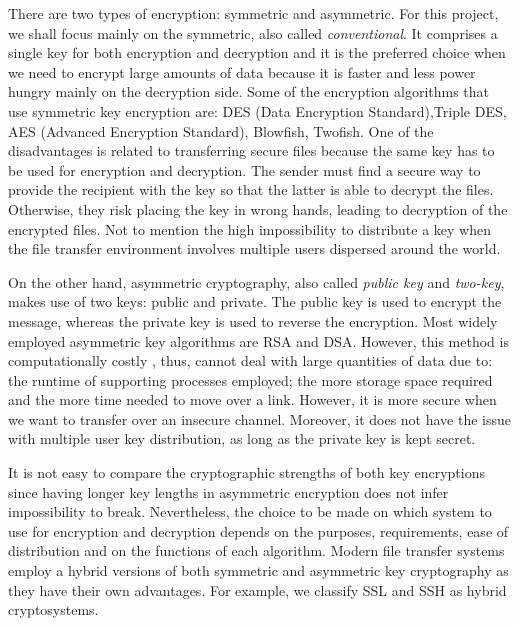 There are two types of encryption: symmetric and asymmetric. For this project, we shall focus mainly on the symmetric, also called \emph{conventional}. It comprises a single key for both encryption and decryption and it is the preferred choice when we need to encrypt large amounts of data because it is faster and less power hungry mainly on the decryption side. Some of the encryption algorithms that use symmetric key encryption are: DES (Data Encryption Standard),Triple DES, AES (Advanced Encryption Standard), Blowfish, Twofish. One of the disadvantages is related to transferring secure files because the same key has to be used for encryption and decryption. The sender must find a secure way to provide the recipient with the key so that the latter is able to decrypt the files. Otherwise, they risk placing the key in wrong hands, leading to decryption of the encrypted files. Not to mention the high impossibility to distribute a key when the file transfer environment involves multiple users dispersed around the world. 

On the other hand, asymmetric cryptography, also called \emph{public key} and \emph{two-key}, makes use of two keys: public and private. The public key is used to encrypt the message, whereas the private key is used to reverse the encryption. Most widely employed asymmetric key algorithms are RSA and DSA. However, this method is computationally costly \cite{wikikey}, thus, cannot deal with large quantities of data due to: the runtime of supporting processes employed; the more storage space required and the more time needed to move over a link. However, it is more secure when we want to transfer over an insecure channel. Moreover, it does not have the issue with multiple user key distribution, as long as the private key is kept secret.

It is not easy to compare the cryptographic strengths of both key encryptions since having longer key lengths in asymmetric encryption does not infer impossibility to break. Nevertheless, the choice to be made on which system to use for encryption and decryption depends on the purposes, requirements, ease of distribution and on the functions of each algorithm. Modern file transfer systems employ a hybrid versions of both symmetric and asymmetric key cryptography as they have their own advantages. For example, we classify SSL and SSH as hybrid cryptosystems. 

